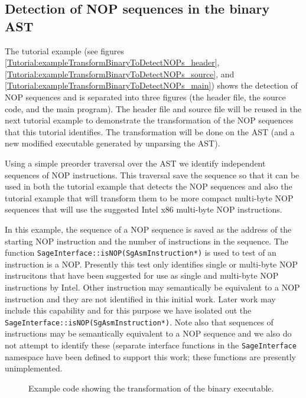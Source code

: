 \subsection{Detection of NOP sequences in the binary AST}

   The tutorial example (see figures \ref{Tutorial:exampleTransformBinaryToDetectNOPs_header},
\ref{Tutorial:exampleTransformBinaryToDetectNOPs_source}, and
\ref{Tutorial:exampleTransformBinaryToDetectNOPs_main})
shows the detection of NOP sequences and is separated into three
figures (the header file, the source code, and the main program).  The header file
and source file will be reused in the next tutorial example to demonstrate the
transformation of the NOP sequences that this tutorial identifies.  The
transformation will be done on the AST (and a new modified executable generated
by unparsing the AST). 

    Using a simple preorder traversal over the AST we identify independent sequences of
NOP instructions.  This traversal save the sequence so that it can be used in both the
tutorial example that detects the NOP sequences and also the tutorial example that 
will transform them to be more compact multi-byte NOP sequences that will use the
suggested Intel x86 multi-byte NOP instructions.

   In this example, the sequence of a NOP sequence is saved as the address of the 
starting NOP instruction and the number of instructions in the sequence.  The function
{\tt SageInterface::isNOP(SgAsmInstruction*)} is used to test of an instruction is
a NOP.  Presently this test only identifies single or multi-byte NOP instrucitons
that have been suggested for use as single and multi-byte NOP instructions by Intel.
Other instruction may semantically be equivalent to a NOP instruction and they are
not identified in this initial work.  Later work may include this capability and
for this purpose we have isolated out the {\tt SageInterface::isNOP(SgAsmInstruction*)}.
Note also that sequences of instructions may be semantically equivalent to a 
NOP sequence and we also do not attempt to identify these (separate interface 
functions in the {\tt SageInterface} namespace have been defined to support this
work; these functions are presently unimplemented.

\begin{figure}[!h]
{\indent
{
\tiny

\begin{latexonly}
   
\end{latexonly}

\begin{htmlonly}
   
\end{htmlonly}

}
}
\caption{Example code showing the transformation of the binary executable.}
\label{Tutorial:exampleTransformBinaryToInsertNOPs}
\end{figure}


